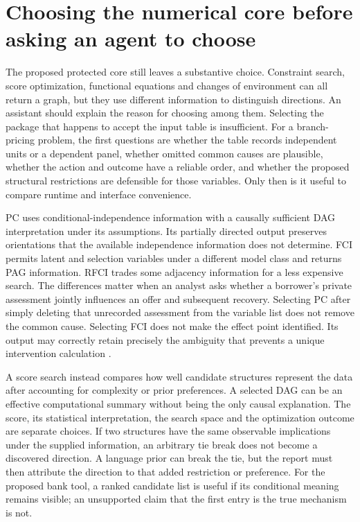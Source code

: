 \section{Choosing the numerical core before asking an agent to choose}
\label{exec14:l4-alternatives}

The proposed protected core still leaves a substantive choice. Constraint
search, score optimization, functional equations and changes of environment
can all return a graph, but they use different information to distinguish
directions. An assistant should explain the reason for choosing among them.
Selecting the package that happens to accept the input table is insufficient.
For a branch-pricing problem, the first questions are whether the table records
independent units or a dependent panel, whether omitted common causes are
plausible, whether the action and outcome have a reliable order, and whether
the proposed structural restrictions are defensible for those variables.
Only then is it useful to compare runtime and interface convenience.

PC uses conditional-independence information with a causally sufficient DAG
interpretation under its assumptions. Its partially directed output preserves
orientations that the available independence information does not determine.
FCI permits latent and selection variables under a different model class and
returns PAG information. RFCI trades some adjacency information for a less
expensive search. The differences matter when an analyst asks whether a
borrower's private assessment jointly influences an offer and subsequent
recovery. Selecting PC after simply deleting that unrecorded assessment from
the variable list does not remove the common cause. Selecting FCI does not
make the effect point identified. Its output may correctly retain precisely
the ambiguity that prevents a unique intervention calculation
\citep{exec13_latentr_colombo2012,exec14_java_latent_sources}.

A score search instead compares how well candidate structures represent the
data after accounting for complexity or prior preferences. A selected DAG
can be an effective computational summary without being the only causal
explanation. The score, its statistical interpretation, the search space and
the optimization outcome are separate choices. If two structures have the
same observable implications under the supplied information, an arbitrary
tie break does not become a discovered direction. A language prior can break
the tie, but the report must then attribute the direction to that added
restriction or preference. For the proposed bank tool, a ranked candidate
list is useful if its conditional meaning remains visible; an unsupported
claim that the first entry is the true mechanism is not.

